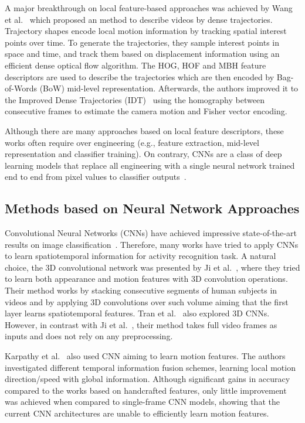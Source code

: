 \documentclass[10pt,conference]{IEEEtran}
\begin{document}
A major breakthrough on local feature-based approaches was achieved by Wang et al.~\cite{Wang:2011} which proposed an method to describe videos by dense trajectories. Trajectory shapes encode local motion information by tracking spatial interest points over time. To generate the trajectories, they sample interest points in space and time, and track them based on displacement information using an efficient dense optical flow algorithm. The HOG, HOF and MBH feature descriptors are used to describe the trajectories which are then encoded by Bag-of-Words (BoW) mid-level representation. Afterwards, the authors improved it to the Improved Dense Trajectories (IDT)~\cite{Wang:2013} using the homography between consecutive frames to estimate the camera motion and Fisher vector encoding. 


Although there are many approaches based on local feature descriptors, these works often require over engineering (e.g., feature extraction, mid-level representation and classifier training). On contrary, CNNs are a class of deep learning models that replace all engineering with a single neural network trained end to end from pixel values to classifier outputs~\cite{Karpathy:2014}.

\subsection{Methods based on Neural Network Approaches}\label{deeplearning}

Convolutional Neural Networks (CNNs) have achieved impressive state-of-the-art results on image classification~\cite{Krizhevsky:2012}. Therefore, many works have tried to apply CNNs to learn spatiotemporal information for activity recognition task. A natural choice, the 3D convolutional network was presented by Ji et al.~\cite{Ji:2013}, where they tried to learn both appearance and motion features with 3D convolution operations. Their method works by stacking consecutive segments of human subjects in videos and by applying 3D convolutions over such volume aiming that the first layer learns spatiotemporal features. Tran et al.~\cite{Tran:2015} also explored 3D CNNs. However, in contrast with Ji et al.~\cite{Ji:2013}, their method takes full video frames as inputs and does not rely on any preprocessing.

Karpathy et al.~\cite{Karpathy:2014} also used CNN aiming to learn motion features. The authors investigated different temporal information fusion schemes, learning local motion direction/speed with global information. Although significant gains in accuracy compared to the works based on handcrafted features, only little improvement was achieved when compared to single-frame CNN models, showing that the current CNN architectures are unable to efficiently learn motion features.
\end{document}
